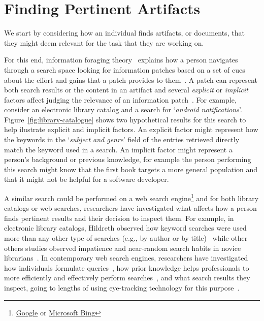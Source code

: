 


\section{Finding Pertinent Artifacts}
\label{cp2:task-approaches}


We start by considering how an individual finds 
artifacts, or documents, that they might deem relevant for 
the task that they are working on. 


For this end, information foraging theory~\cite{Pirolli1999} explains how a person navigates through  
a search space looking for information patches  based on 
a set of cues about the effort and gains that a patch provides to them~\cite{Pirolli1999}.
A patch can represent both search results or the content in an artifact
and several \textit{explicit} or \textit{implicit} factors affect judging the relevance 
of an information patch~\cite{saracevic1975}.
For example,
consider an electronic library catalog and a search for `\textit{android notifications}'.
Figure~\ref{fig:library-catalogue} shows two hypothetical results for this search
to help ilustrate explicit and implicit factors.
An explicit factor might represent how the keywords in the `\textit{subject and genre}' field 
of the entries retrieved 
directly match the keyword used in a search. An implicit factor might represent 
a person's background or previous knowledge, for example 
the person performing this search 
might know that the first book targets a more general population and 
that it might not be helpful for a software developer.








A similar search could be performed on a web search engine\footnote{\href{https://www.google.com/}{Google} or \href{https://www.bing.com/}{Microsoft Bing}}
and for both library catalogs or web searches, researchers have investigated 
what affects how a person finds pertinent results and their decision to inspect them.
For example, in electronic library catalogs,
Hildreth observed how keyword searches were used more than any other type of searches (e.g., by author or by title)~\cite{hildreth1997}
while other 
others studies observed impatience and near-random search habits in novice librarians~\cite{novotny2004don}.
In contemporary web search engines, researchers have  
investigated how individuals formulate queries~\cite{gross2005have, bendersky2012},
how prior knowledge helps professionals
to more efficiently and effectively perform searches~\cite{DeGraaf2014},
and what search results they inspect, going to lengths
of using eye-tracking technology for this purpose~\cite{Cutrell2007, marcos2015}.



